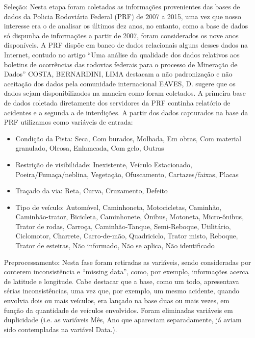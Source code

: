 Seleção: Nesta etapa foram coletadas as informações
provenientes das bases de dados da Policia Rodoviária Federal
(PRF) de 2007 a 2015, uma vez que nosso interesse era o de
analisar os últimos dez anos, no entanto, como a base de dados
só dispunha de informações a partir de 2007, foram
considerados os nove anos disponíveis. A PRF dispõe em
banco de dados relacionais alguns desses dados na Internet,
contudo no artigo “Uma análise da qualidade dos dados
relativos aos boletins de ocorrências das rodovias federais para
o processo de Mineração de Dados” COSTA, BERNARDINI,
LIMA \cite{Costa2015} destacam a não padronização e não aceitação dos
dados pela comunidade internacional EAVES, D. \cite{Eaves} sugere
que os dados sejam disponibilizados na maneira como foram
coletados. A primeira base de dados coletada diretamente dos
servidores da PRF continha relatório de acidentes e a segunda a
de interdições. A partir dos dados capturados na base da PRF
utilizamos como variáveis de entrada:

\begin{itemize}
 \item Condição da Pista: {Seca, Com burados, Molhada, Em obras, Com material granulado, Oleosa, Enlameada, Com gelo, Outras}
 \item Restrição de visibilidade: {Inexistente, Veículo Estacionado, Poeira/Fumaça/neblina, Vegetação, Ofuscamento, Cartazes/faixas, Placas}
 \item Traçado da via: {Reta, Curva, Cruzamento, Defeito}
 \item Tipo de veículo: {Automóvel, Caminhoneta, Motocicletas, Caminhão, Caminhão-trator, Bicicleta, Caminhonete, Ônibus, Motoneta, Micro-ônibus, Trator
 de rodas, Carroça, Caminhão-Tanque, Semi-Reboque, Utilitário, Ciclomotor, Charrete, Carro-de-mão, Quadriciclo, Trator misto, Reboque, Trator de esteiras,
 Não informado, Não se aplica, Não identificado}
\end{itemize}

Preprocessamento: Nesta fase foram retiradas as variáveis,
sendo consideradas por conterem inconsistência e “missing
data”, como, por exemplo, informações acerca de latitude e
longitude. Cabe destacar que a base, como um todo,
apresentava sérias inconsistências, uma vez que, por exemplo,
um mesmo acidente, quando envolvia dois ou mais veículos,
era lançado na base duas ou mais vezes, em função da
quantidade de veículos envolvidos. Foram eliminadas variáveis
em duplicidade (i.e. as variáveis Mês, Ano que apareciam
separadamente, já aviam sido contempladas na variável Data.).

